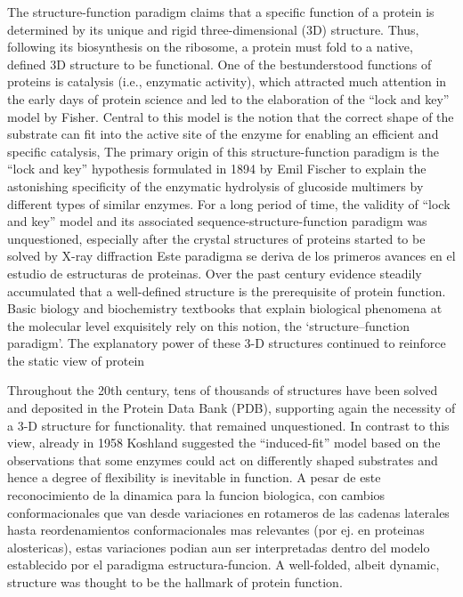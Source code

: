 The structure-function paradigm claims that a specific function of a protein is determined by its unique and rigid three-dimensional (3D) structure. 
Thus, following its biosynthesis on the ribosome, a protein must fold to a native, defined 3D structure to be functional. 
One of the bestunderstood functions of proteins is catalysis (i.e., enzymatic activity), which attracted much attention in the early days of
protein science and led to the elaboration of the “lock and key” model by Fisher. 
Central to this model is the notion that the correct shape of the substrate can fit into the active site of the enzyme for enabling an efficient and specific catalysis,
The primary origin of this structure-function paradigm is the “lock and key” hypothesis formulated in 1894 by Emil Fischer to explain the astonishing specificity of the enzymatic hydrolysis of glucoside multimers by different types
of similar enzymes. For a long period of time, the validity of “lock and key” model and its associated sequence-structure-function paradigm was unquestioned, especially after the crystal structures of proteins started to be solved by X-ray diffraction
Este paradigma se deriva de los primeros avances en el estudio de estructuras de proteinas. Over the past century evidence steadily accumulated that a well-defined structure is the prerequisite of protein function.
Basic biology and biochemistry textbooks that explain biological phenomena at the molecular level exquisitely rely on this notion, the ‘structure–function paradigm’.
The explanatory power of these 3-D structures continued to reinforce the static view of protein

Throughout the 20th century, tens of thousands of structures have been solved and deposited in the Protein Data Bank (PDB), supporting again the necessity of a 3-D structure for functionality.
that remained unquestioned.
In contrast to this view, already in 1958 Koshland suggested the “induced-fit” model based on the observations that some enzymes could act on
differently shaped substrates and hence a degree of flexibility is inevitable in function. 
A pesar de este reconocimiento de la dinamica para la funcion biologica, con cambios conformacionales que van desde variaciones en rotameros de las cadenas laterales hasta reordenamientos conformacionales mas relevantes
(por ej. en proteinas alostericas), estas variaciones podian aun ser interpretadas dentro del modelo establecido por el paradigma estructura-funcion.
A well-folded, albeit dynamic, structure was thought to be the hallmark of protein function.

